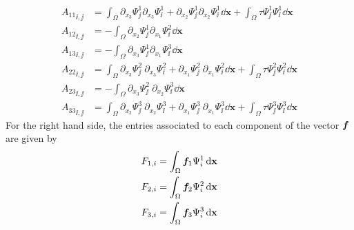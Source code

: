 \begin{align*}
  {A_{11}}_{\ii, \jj} &=   \int_{\Omega} 
          \partial_{x_3} \Psi^{1}_{\jj} \partial_{x_3} \Psi^{1}_{\ii} 
        + \partial_{x_2} \Psi^{1}_{\jj} \partial_{x_2} \Psi^{1}_{\ii}
        \dd \mathbf{x} 
                       +   \int_{\Omega} 
                       \tau \Psi^{1}_{\jj} \Psi^{1}_{\ii} 
        \dd \mathbf{x} 
  \\
  {A_{12}}_{\ii, \jj} &= - \int_{\Omega} 
          \partial_{x_2} \Psi^{1}_{\jj} \partial_{x_1} \Psi^{2}_{\ii}
        \dd \mathbf{x} 
  \\
  {A_{13}}_{\ii, \jj} &= -  \int_{\Omega} 
         \partial_{x_3} \Psi^{1}_{\jj} \partial_{x_1} \Psi^{3}_{\ii}
        \dd \mathbf{x} 
  \\
  {A_{22}}_{\ii, \jj} &=   \int_{\Omega} 
         \partial_{x_3} \Psi^{2}_{\jj} ~ \partial_{x_3} \Psi^{2}_{\ii} 
       + \partial_{x_1} \Psi^{2}_{\jj} ~ \partial_{x_1} \Psi^{2}_{\ii}
        \dd \mathbf{x} 
                       +   \int_{\Omega} 
                       \tau \Psi^{2}_{\jj} \Psi^{2}_{\ii} 
        \dd \mathbf{x} 
  \\
  {A_{23}}_{\ii, \jj} &=  -  \int_{\Omega} 
       \partial_{x_3} \Psi^{2}_{\jj} ~  \partial_{x_2} \Psi^{3}_{\ii} 
        \dd \mathbf{x} 
  \\
  {A_{33}}_{\ii, \jj} &=   \int_{\Omega} 
         \partial_{x_2} \Psi^{3}_{\jj} ~ \partial_{x_2} \Psi^{3}_{\ii} 
       + \partial_{x_1} \Psi^{3}_{\jj} ~ \partial_{x_1} \Psi^{3}_{\ii}
        \dd \mathbf{x} 
                       +   \int_{\Omega} 
                       \tau \Psi^{3}_{\jj} \Psi^{3}_{\ii} 
        \dd \mathbf{x} 
\end{align*}
For the right hand side, the entries associated to each component of the vector $\bm{f}$ are given by
\begin{align*}
    F_{1, i} & = \int_{\Omega} \bm{f}_1 \Psi^1_{i} \,{\rm d} \mathbf{x} \\
    F_{2, i} & = \int_{\Omega} \bm{f}_2 \Psi^2_{i} \,{\rm d} \mathbf{x} \\
    F_{3, i} & = \int_{\Omega} \bm{f}_3 \Psi^3_{i} \,{\rm d} \mathbf{x} 
\end{align*}
